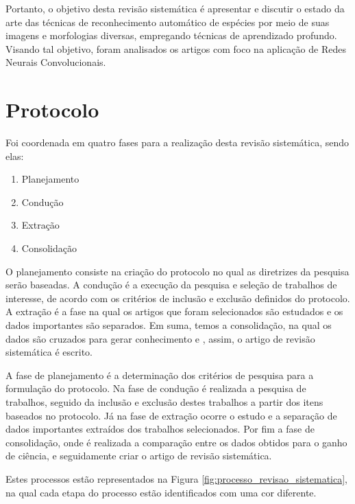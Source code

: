 \documentclass[
	12pt,				%
	oneside,			%
	a4paper,			%
	english,			%
	brazil				%
	]{abntex2ppgsi}
\begin{document}
Portanto, o objetivo desta revisão sistemática é apresentar e discutir o estado da arte das técnicas de reconhecimento automático de espécies por meio de suas imagens e morfologias diversas, empregando técnicas de aprendizado profundo. Visando tal objetivo, foram analisados os artigos com foco na aplicação de Redes Neurais Convolucionais.

\section{Protocolo}

Foi coordenada em quatro fases para a realização desta revisão sistemática, sendo elas:

\begin{enumerate}
  \item Planejamento
  \item Condução
  \item Extração
  \item Consolidação
\end{enumerate}

O planejamento consiste na criação do protocolo no qual as diretrizes da pesquisa serão baseadas. A condução é a execução da pesquisa e seleção de trabalhos de interesse, de acordo com os critérios de inclusão e exclusão definidos do protocolo. A extração é a fase na qual os artigos que foram selecionados são estudados e os dados importantes são separados. Em suma, temos a consolidação, na qual os dados são cruzados para gerar conhecimento e , assim, o artigo de revisão sistemática é escrito.

A fase de planejamento é a determinação dos critérios de pesquisa para a formulação do protocolo. Na fase de condução é realizada a pesquisa de trabalhos, seguido da inclusão e exclusão destes trabalhos a partir dos itens baseados no protocolo. Já na fase de extração ocorre o estudo e a separação de dados importantes extraídos dos trabalhos selecionados. Por fim a fase de consolidação, onde é realizada a comparação entre os dados obtidos para o ganho de ciência, e seguidamente criar o artigo de revisão sistemática.

Estes processos estão representados na Figura \ref{fig:processo_revisao_sistematica}, na qual cada etapa do processo estão identificados com uma cor diferente.
\end{document}
